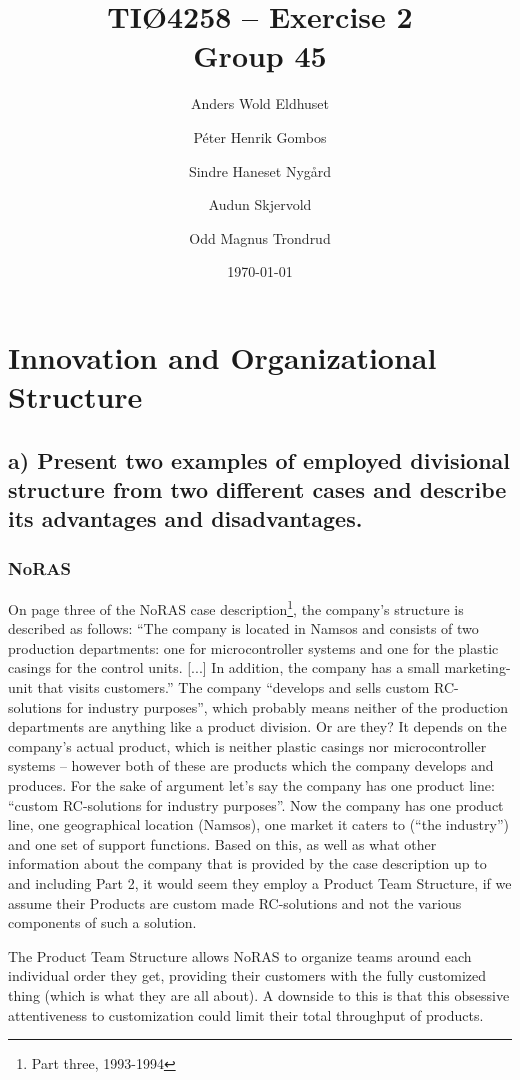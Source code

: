 \documentclass[a4paper]{article}
\title{TIØ4258 -- Exercise 2 \\ Group 45}
\author{
    Anders Wold Eldhuset \and
    Péter Henrik Gombos \and
    Sindre Haneset Nygård \and
    Audun Skjervold \and
    Odd Magnus Trondrud
}
\date{\today}
\begin{document}
    \maketitle
    \newpage
    \setcounter{secnumdepth}{2}

    \section{Innovation and Organizational Structure} %

    \subsection*{a) Present two examples of employed divisional structure from
    two different cases and describe its advantages and disadvantages.}

    \subsubsection{NoRAS} On page three of the NoRAS case
    description\footnote{Part three, 1993-1994}, the company's structure is
    described as follows: ``The company is located in Namsos and consists
    of two production departments: one for microcontroller systems and one
    for the plastic casings for the control units. [...] In addition, the
    company has a small marketing-unit that visits customers.'' The company
    ``develops and sells custom RC-solutions for industry purposes'', which
    probably means neither of the production departments are anything like
    a product division. Or are they? It depends on the company's actual
    product, which is neither plastic casings nor microcontroller systems
    -- however both of these are products which the company develops and
    produces. For the sake of argument let's say the company has one product
    line: ``custom RC-solutions for industry purposes''. Now the company has
    one product line, one geographical location (Namsos), one market it caters
    to (``the industry'') and one set of support functions. Based on this, as
    well as what other information about the company that is provided by the
    case description up to and including Part 2, it would seem they employ
    a Product Team Structure, if we assume their Products are custom made
    RC-solutions and not the various components of such a solution.

    The Product Team Structure allows NoRAS to organize teams around each
    individual order they get, providing their customers with the fully
    customized thing (which is what they are all about).
    A downside to this is that this obsessive attentiveness to customization
    could limit their total throughput of products.
\end{document}
